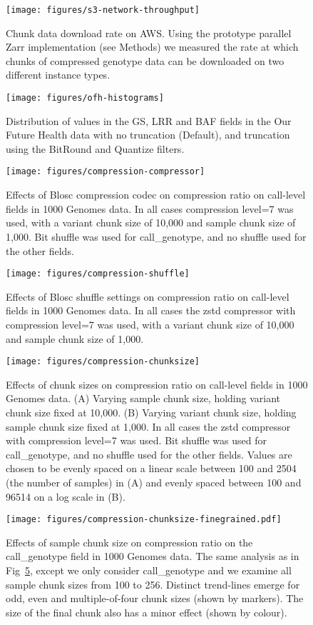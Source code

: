 \documentclass[a4paper,num-refs]{oup-contemporary}
\begin{document}
\begin{figure}[h]
\texttt{[image: figures/s3-network-throughput]}
\caption{Chunk data download rate on AWS.
Using the prototype parallel Zarr implementation (see Methods) we 
measured the rate at which chunks of compressed genotype data 
can be downloaded on two different instance types.
\label{fig-s3-network-throughput}}
\end{figure}

\begin{figure}[h]
\texttt{[image: figures/ofh-histograms]}
\caption{Distribution of values in the GS, LRR and BAF fields in the Our Future
Health data with no truncation (Default), and truncation using the BitRound
and Quantize filters.
\label{fig-ofh-field-distributions}}
\end{figure}

\begin{figure}[h]
\texttt{[image: figures/compression-compressor]}
\caption{Effects of Blosc compression codec on compression ratio on call-level
fields in 1000 Genomes data.
In all cases compression level=7 was used, with a variant
chunk size of 10,000 and sample chunk size of 1,000.
Bit shuffle was used for call\_genotype, and no shuffle used for the other fields.
\label{fig-compression-compressor}}
\end{figure}

\begin{figure}[h]
\texttt{[image: figures/compression-shuffle]}
\caption{Effects of Blosc shuffle settings on compression ratio on call-level
fields in 1000 Genomes data.
In all cases the zstd compressor with compression level=7 was used, with a variant
chunk size of 10,000 and sample chunk size of 1,000.
\label{fig-compression-shuffle}}
\end{figure}

\begin{figure}[h]
\texttt{[image: figures/compression-chunksize]}
\caption{Effects of chunk sizes on compression ratio on call-level
fields in 1000 Genomes data.
(A) Varying sample chunk size, holding variant chunk size fixed at 10,000.
(B) Varying variant chunk size, holding sample chunk size fixed at 1,000.
In all cases the zstd compressor with compression level=7 was used. Bit shuffle
was used for call\_genotype, and no shuffle used for the other fields.
Values are chosen to be evenly spaced on a linear scale
between 100 and 2504 (the number of samples) in (A) and
evenly spaced between 100 and 96514 on a log scale in (B).
\label{fig-compression-chunksize}}
\end{figure}

\begin{figure}[h]
\texttt{[image: figures/compression-chunksize-finegrained.pdf]}
\caption{Effects of sample chunk size on compression ratio on the call\_genotype
field in 1000 Genomes data.
The same analysis as in Fig~\ref{fig-compression-chunksize}, except we only
consider call\_genotype and we examine all sample chunk sizes from
100 to 256. Distinct trend-lines emerge for odd, even and multiple-of-four
chunk sizes (shown by markers). The size of the final chunk also has a minor
effect (shown by colour).
\label{fig-compression-chunksize-finegrained}}
\end{figure}
\end{document}
